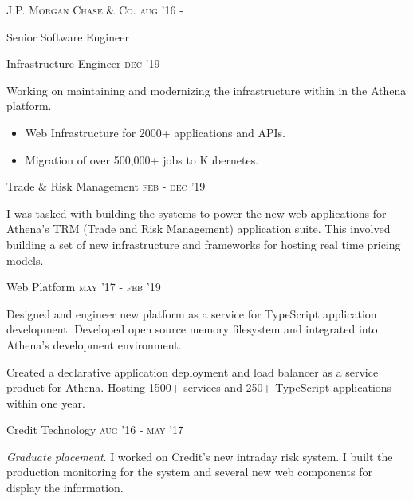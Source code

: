 
\textsc{\small{J.P. Morgan Chase \& Co. }}
\hfill
\textsc{\small{\raggedleft aug '16 -}}

{\Large Senior Software Engineer}

\vspace{5pt}

{\large Infrastructure Engineer}
\hfill
\textsc{\small{\raggedleft dec '19 }}

Working on maintaining and modernizing the infrastructure within in the Athena platform.

\begin{itemize}
	\item Web Infrastructure for 2000+ applications and APIs.
	\item Migration of over 500,000+ jobs to Kubernetes.
\end{itemize}

\vspace{8pt}

\vspace{5pt}

{\large Trade \& Risk Management}
\hfill
\textsc{\small{\raggedleft feb - dec '19}}

I was tasked with building the systems to power the new web applications for Athena's TRM (Trade and Risk Management) application suite. This involved building a set of new infrastructure and frameworks for hosting real time pricing models. 

\vspace{8pt}

{\large Web Platform}
\hfill
\textsc{\small{\raggedleft may '17 - feb '19}}

Designed and engineer new platform as a service for TypeScript application development. Developed open source memory filesystem and  integrated into Athena's development environment. 

Created a declarative application deployment and load balancer as a service product for Athena. Hosting 1500+ services and 250+ TypeScript applications within one year.

\vspace{8pt}

{\large Credit Technology}
\hfill
\textsc{\small{\raggedleft aug '16 - may '17}}

\textit{Graduate placement}. I worked on Credit's new intraday risk system. I built the production monitoring for the system and several new web components for display the information. 